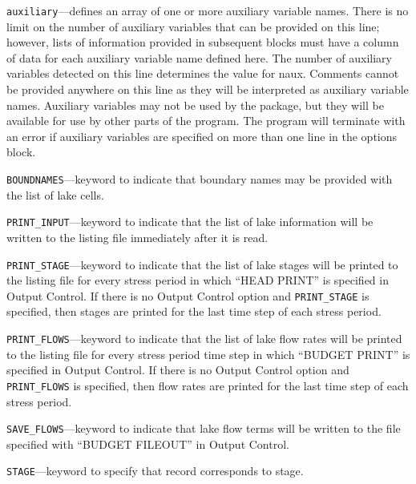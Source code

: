 
\item \texttt{auxiliary}---defines an array of one or more auxiliary variable names.  There is no limit on the number of auxiliary variables that can be provided on this line; however, lists of information provided in subsequent blocks must have a column of data for each auxiliary variable name defined here.   The number of auxiliary variables detected on this line determines the value for naux.  Comments cannot be provided anywhere on this line as they will be interpreted as auxiliary variable names.  Auxiliary variables may not be used by the package, but they will be available for use by other parts of the program.  The program will terminate with an error if auxiliary variables are specified on more than one line in the options block.

\item \texttt{BOUNDNAMES}---keyword to indicate that boundary names may be provided with the list of lake cells.

\item \texttt{PRINT\_INPUT}---keyword to indicate that the list of lake information will be written to the listing file immediately after it is read.

\item \texttt{PRINT\_STAGE}---keyword to indicate that the list of lake stages will be printed to the listing file for every stress period in which ``HEAD PRINT'' is specified in Output Control.  If there is no Output Control option and \texttt{PRINT\_STAGE} is specified, then stages are printed for the last time step of each stress period.

\item \texttt{PRINT\_FLOWS}---keyword to indicate that the list of lake flow rates will be printed to the listing file for every stress period time step in which ``BUDGET PRINT'' is specified in Output Control.  If there is no Output Control option and \texttt{PRINT\_FLOWS} is specified, then flow rates are printed for the last time step of each stress period.

\item \texttt{SAVE\_FLOWS}---keyword to indicate that lake flow terms will be written to the file specified with ``BUDGET FILEOUT'' in Output Control.

\item \texttt{STAGE}---keyword to specify that record corresponds to stage.

